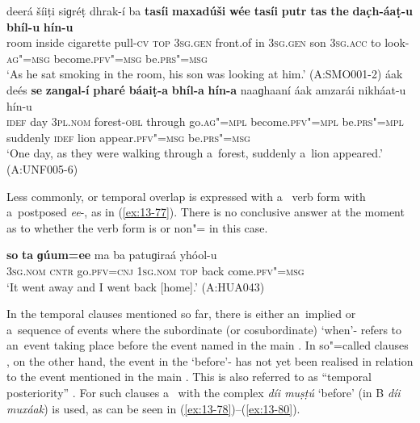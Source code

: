 \ea
\label{ex:13-75}
\gll deerá šíiṭi siɡréṭ dhrak-í ba \textbf{tasíi} \textbf{maxadúši} \textbf{wée} \textbf{tasíi} \textbf{putr} \textbf{tas} \textbf{the} \textbf{dac̣h-áaṭ-u} \textbf{bhíl-u} \textbf{hín-u} \\
room inside cigarette pull-\textsc{cv} \textsc{top} \textsc{3sg.gen} front.of in \textsc{3sg.gen}  son \textsc{3sg.acc} to look-\textsc{ag"=msg} become.\textsc{pfv"=msg} be.\textsc{prs"=msg}  \\
\glt `As he sat smoking in the room, his son was looking at him.' (A:SMO001-2)
\ex
\label{ex:13-76}
\gll áak deés \textbf{se} \textbf{zanɡal-í} \textbf{pharé} \textbf{báaiṭ-a} \textbf{bhíl-a} \textbf{hín-a} naaɡhaaní áak amzarái nikháat-u hín-u \\
\textsc{idef} day \textsc{3pl.nom} forest-\textsc{obl} through go.\textsc{ag"=mpl}  become.\textsc{pfv"=mpl} be.\textsc{prs"=mpl} suddenly \textsc{idef} lion appear.\textsc{pfv"=msg} be.\textsc{prs"=msg}  \\
\glt `One day, as they were walking through a~forest, suddenly a~lion appeared.' (A:UNF005-6) 
\z

Less commonly,  or temporal overlap is expressed with a~ verb form with a~postposed \textit{ee}-, as in (\ref{ex:13-77}). There is no conclusive answer at the moment as to whether the  verb form is  or non"= in this case.

\begin{exe}
\ex
\label{ex:13-77}
\gll \textbf{so} \textbf{ta} \textbf{ɡúum=ee} ma ba patuɡiraá yhóol-u \\
\textsc{3sg.nom} \textsc{cntr} go.\textsc{pfv=cnj} \textsc{1sg.nom} \textsc{top} back  come.\textsc{pfv"=msg} \\
\glt `It went away and I went back [home].' (A:HUA043) 
\end{exe}

 In the temporal clauses mentioned so far, there is either an~implied  or a~sequence of events where the subordinate (or cosubordinate) `when'- refers to an~event taking place before the event named in the main . In so"=called  clauses \citep[327]{givon2001b}, on the other hand, the event in the `before'- has not yet been realised in relation to the event mentioned in the main  \citep[247--248]{thompsonetal2007}. This is also referred to as ``temporal posteriority'' \citep[159]{cristofaro2005}. For such clauses a~ with the complex  \textit{díi muṣṭú} `before' (in B \textit{díi muxáak}) is used, as can be seen in (\ref{ex:13-78})--(\ref{ex:13-80}).

